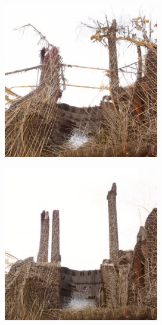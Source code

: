 \documentclass{article}
\begin{document}
\begin{figure}
\begin{subfigure}[b]{0.19\linewidth}
    \end{subfigure}
    \begin{subfigure}[b]{0.19\linewidth}
    \includegraphics[width=\linewidth]{figures/imagenet256/solver_samples/imagenet256_fm_ot_11_30.png}
    \end{subfigure}
    \begin{subfigure}[b]{0.19\linewidth}
    \includegraphics[width=\linewidth]{figures/imagenet256/solver_samples/imagenet256_fm_ot_11_50.png}
    \end{subfigure}\\
    

\end{figure}
\end{document}
